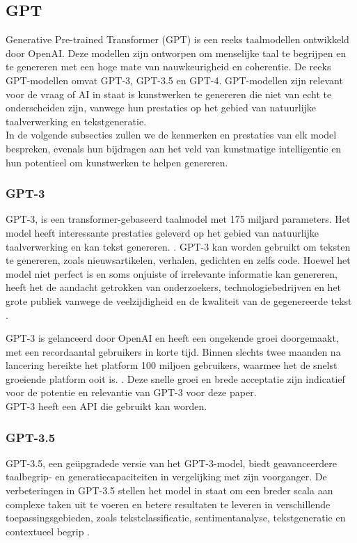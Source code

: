 \subsection{GPT}
Generative Pre-trained Transformer (GPT) is een reeks taalmodellen ontwikkeld door OpenAI. Deze modellen zijn ontworpen om menselijke taal te begrijpen en te genereren met een hoge mate van nauwkeurigheid en coherentie. De reeks GPT-modellen omvat GPT-3, GPT-3.5 en GPT-4. GPT-modellen zijn relevant voor de vraag of AI in staat is kunstwerken te genereren die niet van echt te onderscheiden zijn, vanwege hun prestaties op het gebied van natuurlijke taalverwerking en tekstgeneratie. \\

In de volgende subsecties zullen we de kenmerken en prestaties van elk model bespreken, evenals hun bijdragen aan het veld van kunstmatige intelligentie en hun potentieel om kunstwerken te helpen genereren. \\

\subsubsection{GPT-3}
GPT-3, is een transformer-gebaseerd taalmodel met 175 miljard parameters. Het model heeft interessante prestaties geleverd op het gebied van natuurlijke taalverwerking en kan tekst genereren. \autocite{nytimes_gpt3}. GPT-3 kan worden gebruikt om teksten te genereren, zoals nieuwsartikelen, verhalen, gedichten en zelfs code. Hoewel het model niet perfect is en soms onjuiste of irrelevante informatie kan genereren, heeft het de aandacht getrokken van onderzoekers, technologiebedrijven en het grote publiek vanwege de veelzijdigheid en de kwaliteit van de gegenereerde tekst \autocite{wiki_gpt3}.

GPT-3 is gelanceerd door OpenAI en heeft een ongekende groei doorgemaakt, met een recordaantal gebruikers in korte tijd. Binnen slechts twee maanden na lancering bereikte het platform 100 miljoen gebruikers, waarmee het de snelst groeiende platform ooit is. \autocite{reuters_chatgpt}. Deze snelle groei en brede acceptatie zijn indicatief voor de potentie en relevantie van GPT-3 voor deze paper.\\

GPT-3 heeft een API die gebruikt kan worden.

\subsubsection{GPT-3.5}
GPT-3.5, een geüpgradede versie van het GPT-3-model, biedt geavanceerdere taalbegrip- en generatiecapaciteiten in vergelijking met zijn voorganger. De verbeteringen in GPT-3.5 stellen het model in staat om een breder scala aan complexe taken uit te voeren en betere resultaten te leveren in verschillende toepassingsgebieden, zoals tekstclassificatie, sentimentanalyse, tekstgeneratie en contextueel begrip \autocite{gpt_nappier, gpt_cn}. \\

